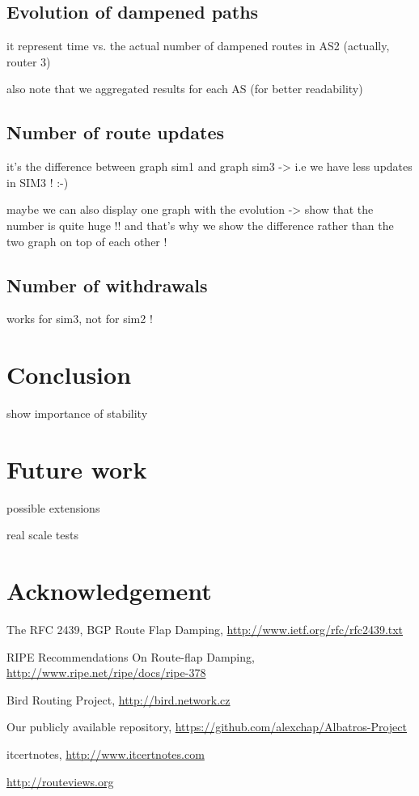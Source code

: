\documentclass[a4paper,english]{IEEEtran}
\begin{document}
\subsection{Evolution of dampened paths}

it represent time vs. the actual number of dampened routes in AS2
(actually, router 3)

also note that we aggregated results for each AS (for better readability)


\subsection{Number of route updates}

it's the difference between graph sim1 and graph sim3 -> i.e we have
less updates in SIM3 ! :-)

maybe we can also display one graph with the evolution -> show that
the number is quite huge !! and that's why we show the difference
rather than the two graph on top of each other !


\subsection{Number of withdrawals}

works for sim3, not for sim2 !


\section{Conclusion}

show importance of stability


\section{Future work}

possible extensions

real scale tests


\section{Acknowledgement}

\begin{thebibliography}{6}

The RFC 2439, BGP Route Flap Damping, \href{http://www.ietf.org/rfc/rfc2439.txt}{http://www.ietf.org/rfc/rfc2439.txt}

 RIPE Recommendations On Route-flap
Damping, \href{http://www.ripe.net/ripe/docs/ripe-378}{http://www.ripe.net/ripe/docs/ripe-378}

Bird Routing Project, \href{http://bird.network.cz}{http://bird.network.cz}

Our publicly available repository, \href{https://github.com/alexchap/Albatros-Project}{https://github.com/alexchap/Albatros-Project}

itcertnotes, \href{www.itcertnotes.com}{http://www.itcertnotes.com}

\href{http://routeviews.org}{http://routeviews.org} 

\end{thebibliography}
\end{document}
